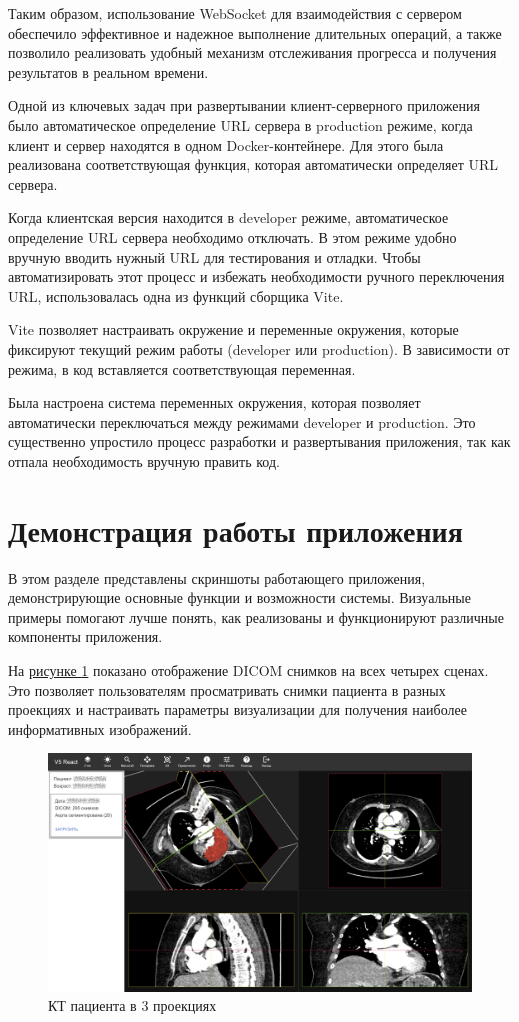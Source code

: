 Таким образом, использование WebSocket для взаимодействия с сервером обеспечило эффективное и надежное выполнение длительных операций, а также позволило реализовать удобный механизм отслеживания прогресса и получения результатов в реальном времени.

Одной из ключевых задач при развертывании клиент-серверного приложения было автоматическое определение URL сервера в production режиме, когда клиент и сервер находятся в одном Docker-контейнере. Для этого была реализована соответствующая функция, которая автоматически определяет URL сервера.

Когда клиентская версия находится в developer режиме, автоматическое определение URL сервера необходимо отключать. В этом режиме удобно вручную вводить нужный URL для тестирования и отладки. Чтобы автоматизировать этот процесс и избежать необходимости ручного переключения URL, использовалась одна из функций сборщика Vite.

Vite позволяет настраивать окружение и переменные окружения, которые фиксируют текущий режим работы (developer или production). В зависимости от режима, в код вставляется соответствующая переменная.

Была настроена система переменных окружения, которая позволяет автоматически переключаться между режимами developer и production. Это существенно упростило процесс разработки и развертывания приложения, так как отпала необходимость вручную править код.

\section{Демонстрация работы приложения}

В этом разделе представлены скриншоты работающего приложения, демонстрирующие основные функции и возможности системы. Визуальные примеры помогают лучше понять, как реализованы и функционируют различные компоненты приложения.

На \hyperref[fig:dicom]{рисунке \ref*{fig:dicom}} показано отображение DICOM снимков на всех четырех сценах. Это позволяет пользователям просматривать снимки пациента в разных проекциях и настраивать параметры визуализации для получения наиболее информативных изображений.

\begin{figure}[h!]
    \centering
    \includegraphics[]{images/chap3/dicom.png}
    \caption{КТ пациента в 3 проекциях}
    \label{fig:dicom}
\end{figure}

